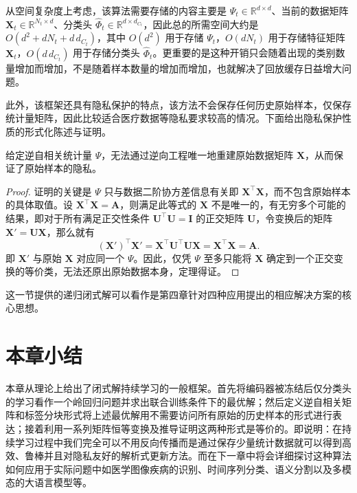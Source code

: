 从空间复杂度上考虑，该算法需要存储的内容主要是 $\Psi_t\in\mathbb{R}^{d\times d}$、当前的数据矩阵 $\mathbf{X}_t\in \mathbb{R}^{N_t\times d}$、分类头 $\widehat{\Phi}_t\in \mathbb{R}^{d\times d_{C_t}}$，因此总的所需空间大约是 $O(d^2+d N_t+d\,d_{C_t})$，其中 $O(d^2)$ 用于存储 $\Psi_t$，$O(d N_t)$ 用于存储特征矩阵 $\mathbf{X}_t$，$O(d\,d_{C_t})$ 用于存储分类头 $\widehat{\Phi}_t$。更重要的是这种开销只会随着出现的类别数量增加而增加，不是随着样本数量的增加而增加，也就解决了回放缓存日益增大问题。

此外，该框架还具有隐私保护的特点，该方法不会保存任何历史原始样本，仅保存统计量矩阵，因此比较适合医疗数据等隐私要求较高的情况。下面给出隐私保护性质的形式化陈述与证明。

\begin{theorem}[隐私保护性]\label{thm:privacy}
给定逆自相关统计量 $\Psi$，无法通过逆向工程唯一地重建原始数据矩阵 $\mathbf{X}$，从而保证了原始样本的隐私。
\end{theorem}

\begin{proof}
证明的关键是 $\Psi$ 只与数据二阶协方差信息有关即 $\mathbf{X}^{\top}\mathbf{X}$，而不包含原始样本的具体取值。设 $\mathbf{X}^{\top}\mathbf{X}=\mathbf{A}$，则满足此等式的 $\mathbf{X}$ 不是唯一的，有无穷多个可能的结果，即对于所有满足正交性条件 $\mathbf{U}^{\top}\mathbf{U}=\mathbf{I}$ 的正交矩阵 $\mathbf{U}$，令变换后的矩阵 $\mathbf{X}'=\mathbf{U}\mathbf{X}$，那么就有
\begin{equation}
(\mathbf{X}')^{\top}\mathbf{X}' = \mathbf{X}^{\top}\mathbf{U}^{\top}\mathbf{U}\mathbf{X} = \mathbf{X}^{\top}\mathbf{X} = \mathbf{A}.
\end{equation}
即 $\mathbf{X}'$ 与原始 $\mathbf{X}$ 对应同一个 $\Psi$。因此，仅凭 $\Psi$ 至多只能将 $\mathbf{X}$ 确定到一个正交变换的等价类，无法还原出原始数据本身，定理得证。
\end{proof}

这一节提供的递归闭式解可以看作是第四章针对四种应用提出的相应解决方案的核心思想。

\section{本章小结}

本章从理论上给出了闭式解持续学习的一般框架。首先将编码器被冻结后仅分类头的学习看作一个岭回归问题并求出联合训练条件下的最优解；然后定义逆自相关矩阵和标签分块形式将上述最优解用不需要访问所有原始的历史样本的形式进行表达；接着利用一系列矩阵恒等变换及推导证明这两种形式是等价的。即说明：在持续学习过程中我们完全可以不用反向传播而是通过保存少量统计数据就可以得到高效、鲁棒并且对隐私友好的解析式更新方法。而在下一章中将会详细探讨这种算法如何应用于实际问题中如医学图像疾病的识别、时间序列分类、语义分割以及多模态的大语言模型等。